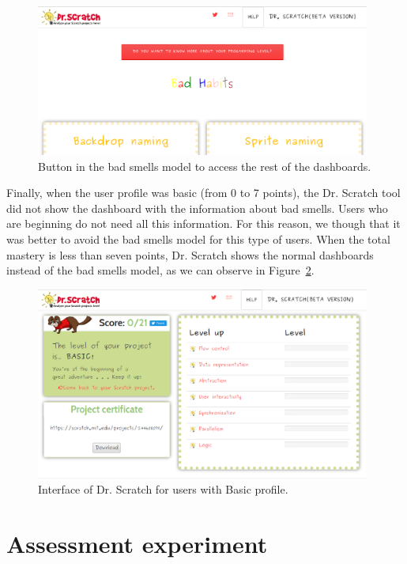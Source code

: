 \begin{figure}
    \centering
    \includegraphics[width=11cm,                         keepaspectratio]{img/button.png}
    \caption{Button in the bad smells model to access the rest of the dashboards.}
    \label{fig:button}
\end{figure}


Finally, when the user profile was basic (from 0 to 7 points), the Dr. Scratch tool did not show the dashboard with the information about bad smells. Users who are beginning do not need all this information. For this reason, we though that it was better to avoid the bad smells model for this type of users. When the total mastery is less than seven points, Dr. Scratch shows the normal dashboards instead of the bad smells model, as we can observe in Figure~\ref{fig:basic_level}.

\begin{figure}
    \centering
    \includegraphics[width=11cm,                         keepaspectratio]{img/basic_level.png}
    \caption{Interface of Dr. Scratch for users with Basic profile.}
    \label{fig:basic_level}
\end{figure}


\section{Assessment experiment}
\label{sec:experiment}

